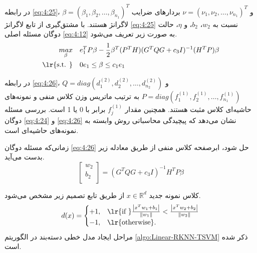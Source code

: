 در رابطه \ref{eq:4:25}،  $\beta=(\beta_{1}, \beta_{2}, \dots,\beta_{n_{1}})^{T}$ و $\nu=(\nu_{1}, \nu_{2}, \dots,\nu_{n_{1}})^{T}$ بردارهای ضرایب لاگرانژ هستند. با مشتق‌گیری از تابع لاگرانژ \ref{eq:4:25} نسبت به  $w_{2}$،  $b_{2}$، و  $\eta$، حالت دوگان مسئله اصلی \ref{eq:4:12} به صورت زیر تعریف می‌شود.
\begin{equation}\label{eq:4:26}
\begin{split}
\mathop{{max}}\limits_{\beta} \quad & e_{1}^{T}P\beta-\frac{1}{2}{{\beta}^{T}}(P^{T}H){(G^{T}QG+c_{3}I)^{-1}}{({H}^{T}P)}\beta   \\
\textrm{\lr{s.t. }} \quad & 0{{e}_{1}}\le \beta \le {c_{1}}{{e}_{1}}
\end{split}
\end{equation}

در رابطه \ref{eq:4:26}،  $Q=diag(d^{(2)}_{1},d^{(2)}_{2},\dots,d^{(2)}_{n_{2}})$ و  $P=diag(f^{(1)}_{1},f^{(1)}_{2},\dots,f^{(1)}_{n_{1}})$ به ترتیب ماتریس وزن کلاس منفی و نمونه‌های حاشیه‌ای کلاس مثبت هستند. همچنین مقدار  $f^{(1)}_{j}$ برابر با 0 یا 1 است. بررسی مسئله دوگان \ref{eq:4:24} و \ref{eq:4:26} نشان می‌دهد که پیچیدگی محاسباتی روش  وابسته به نمونه‌های حاشیه‌ای است.

زمانی‌که مسئله دوگان \ref{eq:4:26} حل شود، ابرصفحه کلاس منفی از طریق معادله زیر بدست می‌آید.
\begin{equation} \label{eq:4:27}
\left[ \begin{matrix}
{{w}_{2}}  \\
{{b}_{2}}  \\
\end{matrix} \right] = (G^{T}QG+c_{3}I)^{-1}H^{T}P\beta
\end{equation}

کلاس نمونه جدید $x \in \mathbb{R}^{d}$ از طریق تابع تصمیم زیر مشخص می‌شود.
\begin{equation}\label{eq:4:28}
d(x) =
\begin{cases}
+1, & \textrm{\lr{if }} \frac{\left| {{x}^{T}}{{w}_{1}}+{{b}_{1}} \right|}{\left\|w_1\right\|} < \frac{\left| {{x}^{T}}{{w}_{2}}+{{b}_{2}} \right|}{\left\|w_2\right\|} \\
-1, & \textrm{\lr{otherwise}}.
\end{cases}
\end{equation}
مراحل ایجاد مدل خطی دسته‌بند  در الگوریتم \ref{algo:Linear-RKNN-TSVM} ذکر شده است.
 
